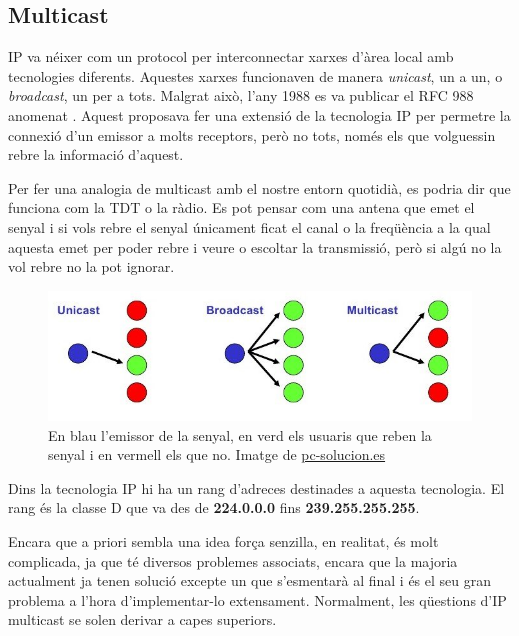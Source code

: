 \subsection{Multicast}
{
    \ac{IP} va néixer com un protocol per interconnectar xarxes d'àrea local amb tecnologies diferents. Aquestes xarxes funcionaven de manera
    \textit{unicast}, un a un, o \textit{broadcast}, un per a tots. Malgrat això, l'any 1988 es va publicar el RFC 988 anomenat \cite{Host Extension for IP
    Multicasting}. Aquest proposava fer una extensió de la tecnologia IP per permetre la connexió d'un emissor a molts receptors, però no tots, només els
    que volguessin rebre la informació d'aquest.
    
    Per fer una analogia de multicast amb el nostre entorn quotidià, es podria dir que funciona com la \ac{TDT} o la ràdio. Es pot pensar com una antena que
    emet el senyal i si vols rebre el senyal únicament ficat el canal o la freqüència a la qual aquesta emet per poder rebre i veure o escoltar la
    transmissió, però si algú no la vol rebre no la pot ignorar.

    \begin{figure}[H]
        \label{fig:unicast_vs_broadcast_vs_multicast}
        \centering
        \includegraphics[width=\textwidth]{img/02_stateofart/unicast_vs_broadcast_vs_multicast.jpg}
        \caption[Unicast vs Broadcast vs Multicast]{\footnotesize{En blau l'emissor de la senyal, en verd els usuaris que reben la senyal
        i en vermell els que no. Imatge de \url{pc-solucion.es}}}
    \end{figure}

    Dins la tecnologia IP hi ha un rang d'adreces destinades a aquesta tecnologia. El rang és la classe D que va des de \textbf{224.0.0.0} fins
    \textbf{239.255.255.255}.
    
    Encara que a priori sembla una idea força senzilla, en realitat, és molt complicada, ja que té diversos problemes associats, encara que la majoria
    actualment ja tenen solució excepte un que s'esmentarà al final i és el seu gran problema a l'hora d'implementar-lo extensament. Normalment,
    les qüestions d'IP multicast se solen derivar a capes superiors.
}

